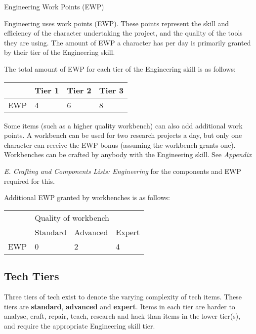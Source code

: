 Engineering Work Points (EWP)

Engineering uses work points (EWP). These points represent the skill and efficiency of the character undertaking the project, and the quality of the tools they are using. The amount of EWP a character has per day is primarily granted by their tier of the Engineering skill.

The total amount of EWP for each tier of the Engineering skill is as follows:

\begin{table}
\begin{tabular}{|l|l|l|l|} \hline 
 & Tier 1 & Tier 2 & Tier 3 \\
 \hline EWP & 4 & 6 & 8 \\
 \hline \end{tabular}

\end{table}

Some items (such as a higher quality workbench) can also add additional work points. A workbench can be used for two research projects a day, but only one character can receive the EWP bonus (assuming the workbench grants one). Workbenches can be crafted by anybody with the Engineering skill. See \textit{Appendix}

\textit{E. Crafting and Components Lists: Engineering} for the components and EWP required for this.

Additional EWP granted by workbenches is as follows:

\begin{table}
\begin{tabular}{|l|l|l|l|} \hline 
\multirow{1}{*}{}& \multicolumn{3}{|l|}{Quality of workbench} \\
\cline{2-2}\cline{3-3}\cline{4-4} & Standard & Advanced & Expert \\
 \hline EWP & 0 & 2 & 4 \\
 \hline \end{tabular}

\end{table}

\subsection{Tech Tiers}

Three tiers of tech exist to denote the varying complexity of tech items. These tiers are \textbf{standard}, \textbf{advanced} and \textbf{expert}. Items in each tier are harder to analyse, craft, repair, teach, research and hack than items in the lower tier(s), and require the appropriate Engineering skill tier.

